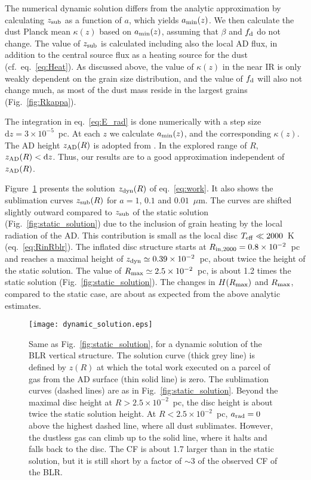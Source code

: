 \documentclass[a4paper,fleqn,usenatbib]{mnras}
\newcommand{\dd}{\textrm{d}}
\newcommand{\mic}{\mbox{$\mu$m}}
\begin{document}
The numerical dynamic solution differs from the analytic approximation by calculating
$z_{\rm sub}$ as a function of $a$, which yields $a_{\rm min}(z)$. We then calculate
the dust Planck mean $\kappa(z)$ based on $a_{\rm min}(z)$, assuming that $\beta$ and $f_{\rm d}$ do not change. The value of $z_{\rm sub}$ is calculated
including also the local AD flux, in addition to the central source flux as a heating source for the 
dust (cf.\ eq.~\ref{eq:Heat}). As discussed above, the value of $\kappa(z)$ in the near IR is only weakly dependent on the grain size distribution,
and the value of $f_{\rm d}$ will also not change much, as most of the dust mass reside in the largest grains (Fig.~\ref{fig:Rkappa}).


The integration in eq.~\ref{eq:E_rad} is done numerically with a step size $\dd z= 3 \times 10^{-5}$~pc. At each $z$ we calculate $a_{\rm min}(z)$, and the corresponding  $\kappa (z)$. The AD height ${z_{\rm AD}(R)}$ is adopted from \citet{SS73}. 
In the explored range of $R$, ${z_{\rm AD}(R)}< \dd z$. Thus, our results are to a good approximation independent of 
${z_{\rm AD}(R)}$.
 
Figure~\ref{fig:dynamic_solution} presents the solution $z_{\rm dyn}(R)$ of eq.~\ref{eq:work}. It also shows the sublimation curves $z_{\rm sub}(R)$ for $a=1$, $0.1$ and $0.01$~\mic. The curves are shifted slightly outward compared to $z_{\rm sub}$ of the static solution (Fig.~\ref{fig:static_solution}) due to the inclusion of grain heating by the local radiation of the AD. This contribution is small as the local disc $T_{\rm eff}\ll 2000$~K 
(eq.~\ref{eq:RinRblr}). The inflated disc structure starts at $R_{\rm in, 2000}=0.8\times10^{-2}$~pc and reaches
a maximal height of $z_{\rm dyn}\simeq0.39\times 10^{-2}$~pc, about twice the height of the static solution.
The value of $R_{\rm max}\simeq 2.5\times10^{-2}$~pc, is about 1.2 times the static solution (Fig.~\ref{fig:static_solution}). The changes in $H(R_{\rm max})$ and $R_{\rm max}$, compared to the static case, are about as expected from the above analytic estimates. 
	

\begin{figure}
\texttt{[image: dynamic\_solution.eps]}
\caption{Same as Fig.~\ref{fig:static_solution}, for a dynamic solution of the BLR vertical structure. The solution curve (thick grey line) is defined by $z(R)$ at which the total work executed on a parcel of gas from the AD surface (thin solid line) is zero. The sublimation curves (dashed lines) are as in Fig.~\ref{fig:static_solution}. 
Beyond the maximal disc height at $R>2.5\times 10^{-2}$~pc, the disc height is about twice the static solution height.
At $R<2.5\times 10^{-2}$~pc, $a_{\rm rad}=0$ above the highest dashed line, where all dust sublimates. However,
the dustless gas can climb up to the solid line, where it halts and falls back to the disc. 
The CF is about 1.7 larger than in the static solution, but it is still short by a factor of $\sim 3$ of the
observed CF of the BLR. }
\label{fig:dynamic_solution}
\end{figure}
\end{document}
